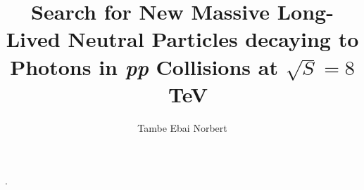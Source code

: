 \phd. %
\title{\bf Search for New Massive Long-Lived Neutral Particles decaying to Photons in \textit{pp} Collisions at $\sqrt{S} = 8$~TeV
    }
\author{Tambe Ebai Norbert}




\abstract{}
\copyrightpage %
\acknowledgements{}
\dedication{}


\beforepreface 

\figurespage
\tablespage

\afterpreface            
